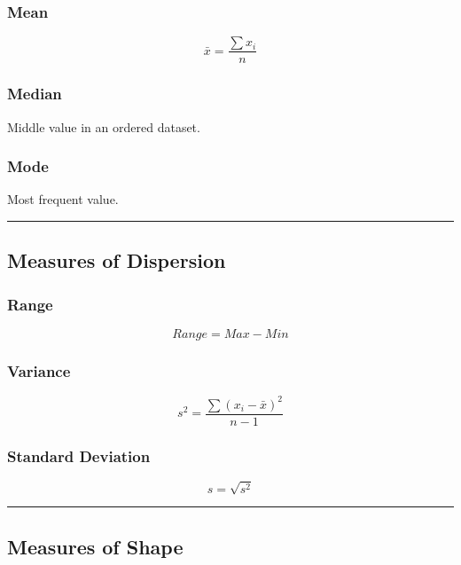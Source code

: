 \documentclass[
  letterpaper,
  DIV=11,
  numbers=noendperiod]{scrreprt}
\begin{document}
\subsubsection{Mean}\label{mean}

\[
\bar{x} = \frac{\sum x_i}{n}
\]

\subsubsection{Median}\label{median}

Middle value in an ordered dataset.

\subsubsection{Mode}\label{mode}

Most frequent value.

\begin{center}\rule{0.5\linewidth}{0.5pt}\end{center}

\subsection{Measures of Dispersion}\label{measures-of-dispersion}

\subsubsection{Range}\label{range-1}

\[
Range = Max - Min
\]

\subsubsection{Variance}\label{variance-1}

\[
s^2 = \frac{\sum (x_i - \bar{x})^2}{n - 1}
\]

\subsubsection{Standard Deviation}\label{standard-deviation-1}

\[
s = \sqrt{s^2}
\]

\begin{center}\rule{0.5\linewidth}{0.5pt}\end{center}

\subsection{Measures of Shape}\label{measures-of-shape}
\end{document}
